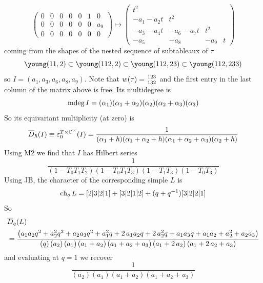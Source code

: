 \documentclass[11pt]{article}
\newcommand{\todo}[1]{{\color{red!50!white}\textbf{#1}}} %
\begin{document}
\begin{description}
$$\begin{pmatrix}
    0&0&0&0&0&1&0\\
    0&0&0&0&0&0&{a}_{9}\\
    0&0&0&0&0&0&0\end{pmatrix} \mapsto \begin{pmatrix}
        t^2 & \\
        - a_1 - a_2 t & t^2 \\
        -a_3 -a_4 t & -a_6 - a_7t & t^2 \\
        - a_5 & -a_8 & -a_9 & t
\end{pmatrix}
$$
coming from the shapes of the nested sequence of subtableaux of $\tau$ 
$$
\young(11,2) \subset \young(112,2) \subset \young(112,23) \subset \young(112,233)
$$
so $I = \left({a}_{1},{a}_{3},{a}_{6},{a}_{8},{a}_{9}\right)$. 
Note that $w(\tau) = {123\atop 132}$ and the first entry in the last column of the matrix above is free.
Its multidegree is
$$
\operatorname{mdeg} I 
= (\alpha_1) (\alpha_1 + \alpha_2) (\alpha_2) (\alpha_2 + \alpha_3) (\alpha_3)
$$ 
So its equivariant multiplicity (at zero) is 
$$
\overline{D}_\hbar(I) \equiv \varepsilon^{T\times\mathbb C^\times}_0(I) = 
\frac 1 {(\alpha_1 + \hbar)(\alpha_1 + \alpha_2 + \hbar) (\alpha_1 + \alpha_2 + \alpha_3)(\alpha_2 + \hbar)}
$$
Using M2 we find that $I$ has Hilbert series
\[
    \frac{1}{\left(1-{T}_{0}{T}_{1}{T}_{2}\right)\left(1-{T}_{0}{T}_{1}{T}_{3}\right)\left(1-{T}_{1}{T}_{3}\right)\left(1-{T}_{0}{T}_{3}\right)}
\]
Using JB, the character of the corresponding simple $L$ is 
\[
    \operatorname{ch}_q L = [2|3|2|1]+[3|2|1|2]+(q+q^{-1})[3|2|2|1]
\]
So 
{\scriptsize 
\begin{align*}
    &\overline{D}_q(L) \\
    &= \frac{\left({a}_{1}{a}_{2}q^{2}+{a}_{2}^{2}q^{2}+{a}_{2}{a}_{3}q^{2}+{a}_{1}^{2}q+2\,{a}_{1}{a}_{2}q+2\,{a}_{2}^{2}q+{a}_{1}{a}_{3}q+{a}_{1}{a}_{2}+{a}_{2}^{2}+{a}_{2}{a}_{3}\right)}{\left(q\right)\left({a}_{2}\right)\left({a}_{1}\right)\left({a}_{1}+{a}_{2}\right)\left({a}_{1}+{a}_{2}+{a}_{
    3}\right)\left({a}_{1}+2\,{a}_{2}\right)\left({a}_{1}+2\,{a}_{2}+{a}_{3}\right)}
\end{align*}}
and evaluating at $q = 1$ we recover
\[
    \frac{1}{\left({a}_{2}\right)\left({a}_{1}\right)\left({a}_{1}+{a}_{2}\right)\left({a}_{1}+{a}_{2}+{a}_{3}\right)}    
\]
\end{description}
\end{document}
